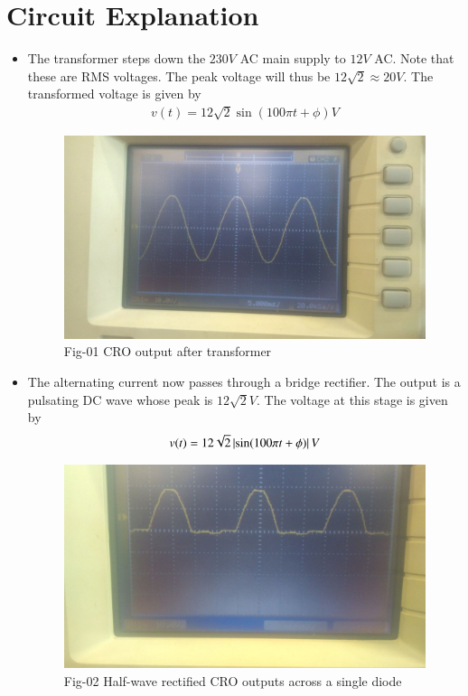 \documentclass[journal,12pt,twocolumn]{IEEEtran}
\numberwithin{figure}{section}
\begin{document}
	\section{Circuit Explanation}
	\begin{itemize}
	\item The transformer steps down the $230 V$ AC main supply to $12 V$ AC. Note that these are RMS voltages. The peak voltage will thus be $12\sqrt{2} \approx 20V$. The transformed voltage is given by
	\begin{align}
		v(t) = 12\sqrt{2}\sin(100\pi t + \phi) V
	\end{align}
	\begin{figure}[!ht]
		\centering
		\includegraphics[width=\columnwidth]{./figs/transformer.jpg}
		\caption*{Fig-01 CRO output after transformer}
		\label{fig-transformer}	
	\end{figure}
	
	\item The alternating current now passes through a bridge rectifier. The output is a pulsating DC wave whose peak is $12\sqrt{2}V$. The voltage at this stage is given by
	\begin{align}
		v(t) = 12\sqrt{2}\left\vert\sin(100\pi t + \phi)\right\vert V
	\end{align}
	\begin{figure}[!ht]
		\centering
		\includegraphics[width=\columnwidth]{./figs/rectifier.jpg}
		\caption*{Fig-02 Half-wave rectified CRO outputs across a single diode}
		\label{fig-rectifier-2}	
	\end{figure}
	

\end{itemize}
\end{document}
